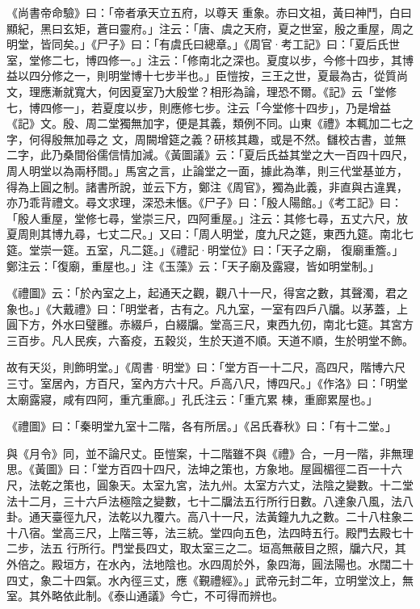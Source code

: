 \begin{pinyinscope}
 《尚書帝命驗》曰：「帝者承天立五府，以尊天
 重象。赤曰文祖，黃曰神鬥，白曰顯紀，黑曰玄矩，蒼曰靈府。」注云：「唐、虞之天府，夏之世室，殷之重屋，周之明堂，皆同矣。」《尸子》曰：「有虞氏曰總章。」《周官·考工記》曰：「夏后氏世室，堂修二七，博四修一。」注云：「修南北之深也。夏度以步，今修十四步，其博益以四分修之一，則明堂博十七步半也。」臣愷按，三王之世，夏最為古，從質尚文，理應漸就寬大，何因夏室乃大殷堂？相形為論，理恐不爾。《記》云「堂修七，博四修一」，若夏度以步，則應修七步。注云「今堂修十四步」，乃是增益《記》文。殷、周二堂獨無加字，便是其義，類例不同。山東《禮》本輒加二七之字，何得殷無加尋之
 文，周闕增筵之義？研核其趣，或是不然。讎校古書，並無二字，此乃桑間俗儒信情加減。《黃圖議》云：「夏后氏益其堂之大一百四十四尺，周人明堂以為兩杼間。」馬宮之言，止論堂之一面，據此為準，則三代堂基並方，得為上圓之制。諸書所說，並云下方，鄭注《周官》，獨為此義，非直與古違異，亦乃乖背禮文。尋文求理，深恐未愜。《尸子》曰：「殷人陽館。」《考工記》曰：「殷人重屋，堂修七尋，堂崇三尺，四阿重屋。」注云：其修七尋，五丈六尺，放夏周則其博九尋，七丈二尺。」又曰：「周人明堂，度九尺之筵，東西九筵。南北七筵。堂崇一筵。五室，凡二筵。」《禮記·明堂位》曰：「天子之廟，
 復廟重簷。」鄭注云：「復廟，重屋也。」注《玉藻》云：「天子廟及露寢，皆如明堂制。」



 《禮圖》云：「於內室之上，起通天之觀，觀八十一尺，得宮之數，其聲濁，君之象也。」《大戴禮》曰：「明堂者，古有之。凡九室，一室有四戶八牖。以茅蓋，上圓下方，外水曰璧雝。赤綴戶，白綴牖。堂高三尺，東西九仞，南北七筵。其宮方三百步。凡人民疾，六畜疫，五穀災，生於天道不順。天道不順，生於明堂不飾。



 故有天災，則飾明堂。」《周書·明堂》曰：「堂方百一十二尺，高四尺，階博六尺三寸。室居內，方百尺，室內方六十尺。戶高八尺，博四尺。」《作洛》曰：「明堂太廟露寢，咸有四阿，重亢重廊。」孔氏注云：「重亢累
 棟，重廊累屋也。」



 《禮圖》曰：「秦明堂九室十二階，各有所居。」《呂氏春秋》曰：「有十二堂。」



 與《月令》同，並不論尺丈。臣愷案，十二階雖不與《禮》合，一月一階，非無理思。《黃圖》曰：「堂方百四十四尺，法坤之策也，方象地。屋圓楣徑二百一十六尺，法乾之策也，圓象天。太室九宮，法九州。太室方六丈，法陰之變數。十二堂法十二月，三十六戶法極陰之變數，七十二牖法五行所行日數。八達象八風，法八卦。通天臺徑九尺，法乾以九覆六。高八十一尺，法黃鐘九九之數。二十八柱象二十八宿。堂高三尺，上階三等，法三統。堂四向五色，法四時五行。殿門去殿七十二步，法五
 行所行。門堂長四丈，取太室三之二。垣高無蔽目之照，牖六尺，其外倍之。殿垣方，在水內，法地陰也。水四周於外，象四海，圓法陽也。水闊二十四丈，象二十四氣。水內徑三丈，應《覲禮經》。」武帝元封二年，立明堂汶上，無室。其外略依此制。《泰山通議》今亡，不可得而辨也。




\end{pinyinscope}
